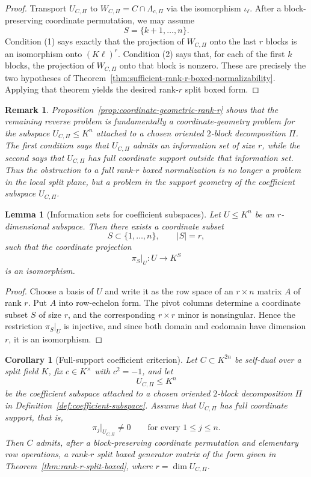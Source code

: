 \documentclass[12pt]{article}
\newtheorem{lemma}[theorem]{Lemma}
\newtheorem{cor}[theorem]{Corollary}
\newtheorem{remark}[theorem]{Remark}
\begin{document}
\begin{proof}
Transport \(U_{C,\Pi}\) to \(W_{C,\Pi}=C\cap \Lambda_{c,\Pi}\) via the isomorphism \(\iota_\ell\). After a block-preserving coordinate permutation, we may assume
\[
S=\{k+1,\dots,n\}.
\]
Condition (1) says exactly that the projection of \(W_{C,\Pi}\) onto the last \(r\) blocks is an isomorphism onto \((K\ell)^r\). Condition (2) says that, for each of the first \(k\) blocks, the projection of \(W_{C,\Pi}\) onto that block is nonzero. These are precisely the two hypotheses of Theorem~\ref{thm:sufficient-rank-r-boxed-normalizability}. Applying that theorem yields the desired rank-\(r\) split boxed form.
\end{proof}

\begin{remark}
\rm
Proposition~\ref{prop:coordinate-geometric-rank-r} shows that the remaining reverse problem is fundamentally a coordinate-geometry problem for the subspace \(U_{C,\Pi}\le K^n\) attached to a chosen oriented \(2\)-block decomposition \(\Pi\). The first condition says that \(U_{C,\Pi}\) admits an information set of size \(r\), while the second says that \(U_{C,\Pi}\) has full coordinate support outside that information set. Thus the obstruction to a full rank-\(r\) boxed normalization is no longer a problem in the local split plane, but a problem in the support geometry of the coefficient subspace \(U_{C,\Pi}\).
\end{remark}

\begin{lemma}[Information sets for coefficient subspaces]
\label{lem:information-set}
Let \(U\le K^n\) be an \(r\)-dimensional subspace. Then there exists a coordinate subset
\[
S\subset \{1,\dots,n\},\qquad |S|=r,
\]
such that the coordinate projection
\[
\pi_S|_U:U\to K^S
\]
is an isomorphism.
\end{lemma}

\begin{proof}
Choose a basis of \(U\) and write it as the row space of an \(r\times n\) matrix \(A\) of rank \(r\). Put \(A\) into row-echelon form. The pivot columns determine a coordinate subset \(S\) of size \(r\), and the corresponding \(r\times r\) minor is nonsingular. Hence the restriction \(\pi_S|_U\) is injective, and since both domain and codomain have dimension \(r\), it is an isomorphism.
\end{proof}

\begin{cor}[Full-support coefficient criterion]
\label{cor:full-support-rank-r-boxed}
Let \(C\subset K^{2n}\) be self-dual over a split field \(K\), fix \(c\in K^\times\) with \(c^2=-1\), and let
\[
U_{C,\Pi}\le K^n
\]
be the coefficient subspace attached to a chosen oriented \(2\)-block decomposition \(\Pi\) in Definition~\ref{def:coefficient-subspace}. Assume that \(U_{C,\Pi}\) has full coordinate support, that is,
\[
\pi_j|_{U_{C,\Pi}}\neq 0
\qquad\text{for every }1\le j\le n.
\]
Then \(C\) admits, after a block-preserving coordinate permutation and elementary row operations, a rank-\(r\) split boxed generator matrix of the form given in Theorem~\ref{thm:rank-r-split-boxed}, where \(r=\dim U_{C,\Pi}\).
\end{cor}
\end{document}
